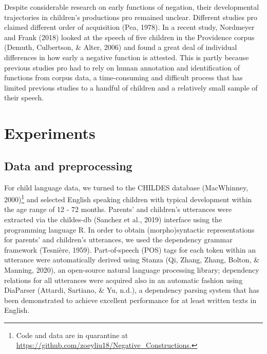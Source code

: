 \documentclass[
  english,
  man,floatsintext]{apa6}
\begin{document}
Despite considerable research on early functions of negation, their developmental trajectories in children's productions pro remained unclear. Different studies pro claimed different order of acquisition (Pea, 1978). In a recent study, Nordmeyer and Frank (2018) looked at the speech of five children in the Providence corpus (Demuth, Culbertson, \& Alter, 2006) and found a great deal of individual differences in how early a negative function is attested. This is partly because previous studies pro had to rely on human annotation and identification of functions from corpus data, a time-consuming and difficult process that has limited previous studies to a handful of children and a relatively small sample of their speech.

\hypertarget{experiments}{%
\section{Experiments}\label{experiments}}

\hypertarget{data-and-preprocessing}{%
\subsection{Data and preprocessing}\label{data-and-preprocessing}}

For child language data, we turned to the CHILDES database (MacWhinney, 2000)\footnote{Code and data are in quarantine at \url{https://github.com/zoeyliu18/Negative_Constructions.}} and selected English speaking children with typical development within the age range of 12 - 72 months. Parents' and children's utterances were extracted via the childes-db (Sanchez et al., 2019) interface using the programming language R. In order to obtain (morpho)syntactic representations for parents' and children's utterances, we used the dependency grammar framework (Tesnière, 1959). Part-of-speech (POS) tags for each token within an utterance were automatically derived using Stanza (Qi, Zhang, Zhang, Bolton, \& Manning, 2020), an open-source natural language processing library; dependency relations for all utterances were acquired also in an automatic fashion using DiaParser (Attardi, Sartiano, \& Yu, n.d.), a dependency parsing system that has been demonstrated to achieve excellent performance for at least written texts in English.
\end{document}

